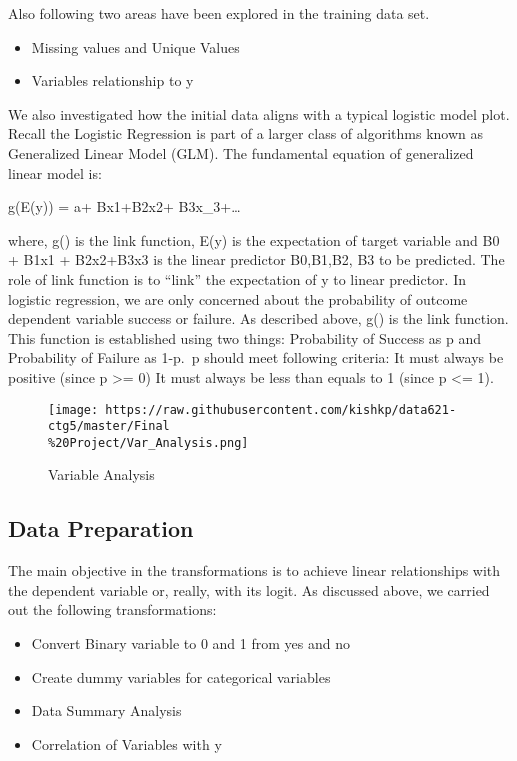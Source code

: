 \documentclass[english,floatsintext,man]{apa6}
\begin{document}
Also following two areas have been explored in the training data set.

\begin{itemize}
\itemsep1pt\parskip0pt
\item
  Missing values and Unique Values
\item
  Variables relationship to y
\end{itemize}

We also investigated how the initial data aligns with a typical logistic
model plot. Recall the Logistic Regression is part of a larger class of
algorithms known as Generalized Linear Model (GLM). The fundamental
equation of generalized linear model is:

g(E(y)) = a+ Bx1+B2x2+ B3x\_3+\ldots{}

where, g() is the link function, E(y) is the expectation of target
variable and B0 + B1x1 + B2x2+B3x3 is the linear predictor B0,B1,B2, B3
to be predicted. The role of link function is to \enquote{link} the
expectation of y to linear predictor. In logistic regression, we are
only concerned about the probability of outcome dependent variable
success or failure. As described above, g() is the link function. This
function is established using two things: Probability of Success as p
and Probability of Failure as 1-p.~p should meet following criteria: It
must always be positive (since p \textgreater{}= 0) It must always be
less than equals to 1 (since p \textless{}= 1).

\begin{figure}[htbp]
\centering
\texttt{[image: https://raw.githubusercontent.com/kishkp/data621-ctg5/master/Final\\\%20Project/Var\_Analysis.png]}
\caption{Variable Analysis}
\end{figure}

\subsection{Data Preparation}\label{data-preparation-1}

The main objective in the transformations is to achieve linear
relationships with the dependent variable or, really, with its logit. As
discussed above, we carried out the following transformations:

\begin{itemize}
\itemsep1pt\parskip0pt
\item
  Convert Binary variable to 0 and 1 from yes and no
\item
  Create dummy variables for categorical variables
\item
  Data Summary Analysis
\item
  Correlation of Variables with y
\end{itemize}
\end{document}
